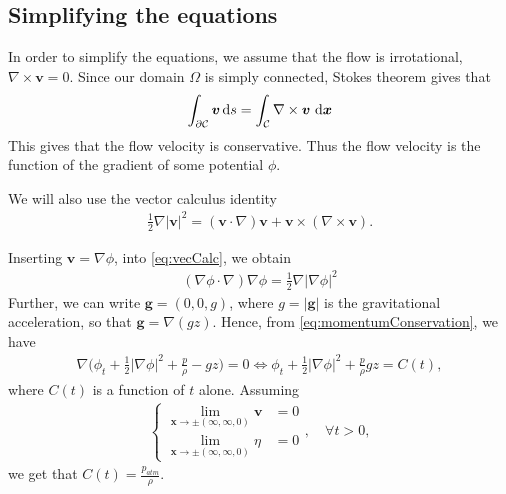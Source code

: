 \documentclass[11pt]{article}
\begin{document}
\subsection{Simplifying the equations}
In order to simplify the equations, we assume that the flow is irrotational, $\nabla \times \bm{v} = 0$. Since
our domain $\Omega$ is simply connected, Stokes theorem gives that
\begin{align*}
	\int_{\partial \mathcal{C}} \bm{v} \operatorname{d}\! s = \int_{\mathcal{C}} \nabla \times \bm{v} \, \operatorname{d}\! \bm{x}
\end{align*}
This gives that the flow velocity is conservative. Thus the flow velocity is the function of the gradient
of some potential $\phi$.

We will also use the vector calculus identity
\begin{align}
    \label{eq:vecCalc}
    \frac{1}{2}\nabla |\bm{v}|^2 = (\bm{v}\cdot \nabla) \bm{v} + \bm{v} \times (\nabla \times \bm{v}).
\end{align}

Inserting $\bm{v} = \nabla \phi$, into \eqref{eq:vecCalc}, we obtain
\begin{align*}
    (\nabla \phi \cdot \nabla) \nabla \phi = \frac{1}{2}\nabla |\nabla \phi|^2
\end{align*}
Further, we can write $\bm{g} = (0,0,g)$, where $g = |\bm{g}|$ is the gravitational acceleration, so that
$\bm{g} = \nabla (gz)$. Hence, from \eqref{eq:momentumConservation}, we have
\begin{align*}
    \nabla\bigg(\phi_t + \frac{1}{2}|\nabla \phi|^2 + \frac{p}{\rho} - g z \bigg) = 0
    \iff \phi_t + \frac{1}{2}|\nabla \phi|^2 + \frac{p}{\rho}  g z = C(t),
\end{align*}
where $C(t)$ is a function of $t$ alone. Assuming 
\begin{align*}
    \begin{cases}
	    \lim_{\bm{x} \rightarrow \pm(\infty,\infty, 0)}\bm{v} & = 0 \\
	    \lim_{\bm{x} \rightarrow \pm(\infty,\infty, 0)}\eta   & = 0
	\end{cases}, \quad \forall t > 0,
\end{align*}
we get that $C(t) = \frac{p_{atm}}{\rho}$.
\end{document}
